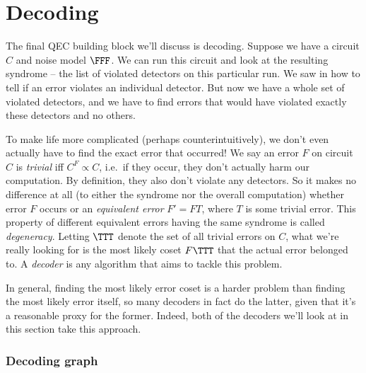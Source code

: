 \chapter{Decoding}\label{ch:decoding}

The final QEC building block we'll discuss is decoding.
Suppose we have a circuit $C$ and noise model $\FFF$.
We can run this circuit and look at the resulting syndrome -- the list of violated detectors on this particular run.
We saw in  how to tell if an error violates an individual detector.
But now we have a whole set of violated detectors, and we have to find errors that would have violated exactly these detectors and no others.

To make life more complicated (perhaps counterintuitively), we don't even actually have to find the exact error that occurred!
We say an error $F$ on circuit $C$ is \textit{trivial} iff $C^F \propto C$, i.e.\ if they occur, they don't actually harm our computation.
By definition, they also don't violate any detectors.
So it makes no difference at all (to either the syndrome nor the overall computation) whether error $F$ occurs or an \textit{equivalent error} $F' = FT$, where $T$ is some trivial error.
This property of different equivalent errors having the same syndrome is called \textit{degeneracy}.
Letting $\TTT$ denote the set of all trivial errors on $C$, what we're really looking for is the most likely coset $F\TTT$ that the actual error belonged to.
A \textit{decoder} is any algorithm that aims to tackle this problem.

In general, finding the most likely error coset is a harder problem than finding the most likely error itself, so many decoders in fact do the latter, given that it's a reasonable proxy for the former.
Indeed, both of the decoders we'll look at in this section take this approach.

\subsection{Decoding graph}

